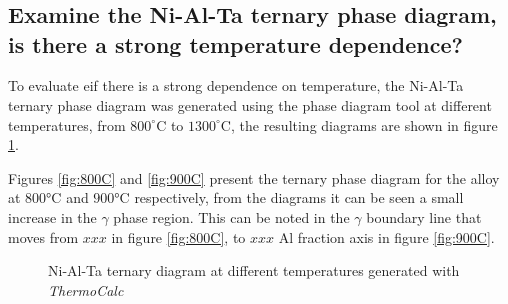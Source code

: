 \newpage
\section{}

\subsection{Examine the Ni-Al-Ta ternary phase diagram, is there a strong temperature dependence?}

To evaluate eif there is a strong dependence on temperature, the Ni-Al-Ta ternary phase diagram was generated using the phase diagram tool at different temperatures, from $800^{\circ}$C to $1300^{\circ}$C, the resulting diagrams are shown in figure \ref{fig:diagram02}.

Figures \ref{fig:800C} and \ref{fig:900C} present the ternary phase diagram for the alloy at $800$°C and $900$°C respectively, from the diagrams it can be seen a small increase in the $\gamma$ phase  region. This can be noted in the $\gamma$ boundary line that moves from $xxx$ in figure \ref{fig:800C}, to $xxx$ Al fraction axis in figure \ref{fig:900C}.

\begin{figure}[h]
  \centering
  \caption{Ni-Al-Ta ternary diagram at different temperatures generated with \textit{ThermoCalc} \citep{thermocalc}}
  \label{fig:diagram02}
\end{figure}

